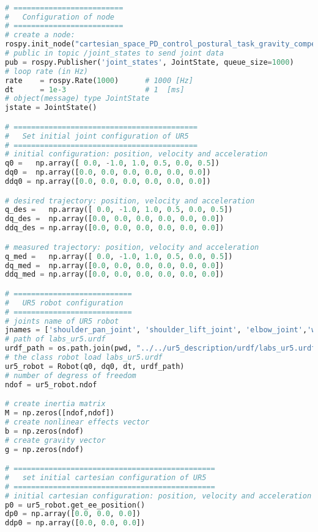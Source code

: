 \begin{lstlisting}[language=Python,caption=Move the ur5 robot end-effector using PD control method with gravity compensation and null space projection to follows the Cartesian step reference trajectory of activity \ref{subsec:generate_step_reference}., label={lst:cartesian_PD_control_g_postural_task}]

# =========================
#   Configuration of node
# =========================
# create a node: 
rospy.init_node("cartesian_space_PD_control_postural_task_gravity_compensation")
# public in topic /joint_states	to send joint data	
pub = rospy.Publisher('joint_states', JointState, queue_size=1000)
# loop rate (in Hz)
rate 	= rospy.Rate(1000)		# 1000 [Hz]
dt 		= 1e-3					# 1  [ms]
# object(message) type JointState
jstate = JointState()

# ==========================================
#   Set initial joint configuration of UR5
# ==========================================
# initial configuration: position, velocity and acceleration 
q0 =   np.array([ 0.0, -1.0, 1.0, 0.5, 0.0, 0.5])
dq0 =  np.array([0.0, 0.0, 0.0, 0.0, 0.0, 0.0]) 
ddq0 = np.array([0.0, 0.0, 0.0, 0.0, 0.0, 0.0]) 

# desired trajectory: position, velocity and acceleration
q_des =   np.array([ 0.0, -1.0, 1.0, 0.5, 0.0, 0.5])
dq_des =  np.array([0.0, 0.0, 0.0, 0.0, 0.0, 0.0]) 
ddq_des = np.array([0.0, 0.0, 0.0, 0.0, 0.0, 0.0]) 

# measured trajectory: position, velocity and acceleration
q_med =   np.array([ 0.0, -1.0, 1.0, 0.5, 0.0, 0.5])
dq_med =  np.array([0.0, 0.0, 0.0, 0.0, 0.0, 0.0]) 
ddq_med = np.array([0.0, 0.0, 0.0, 0.0, 0.0, 0.0]) 

# ===========================
#   UR5 robot configuration
# ===========================
# joints name of UR5 robot
jnames = ['shoulder_pan_joint', 'shoulder_lift_joint', 'elbow_joint','wrist_1_joint', 'wrist_2_joint', 'wrist_3_joint']
# path of labs_ur5.urdf
urdf_path = os.path.join(pwd, "../../ur5_description/urdf/labs_ur5.urdf")
# the class robot load labs_ur5.urdf
ur5_robot = Robot(q0, dq0, dt, urdf_path)
# number of degress of freedom
ndof = ur5_robot.ndof

# create inertia matrix 
M = np.zeros([ndof,ndof])
# create nonlinear effects vector
b = np.zeros(ndof)
# create gravity vector
g = np.zeros(ndof)

# ==============================================
#   set initial cartesian configuration of UR5
# ==============================================
# initial cartesian configuration: position, velocity and acceleration
p0 = ur5_robot.get_ee_position()
dp0 = np.array([0.0, 0.0, 0.0])
ddp0 = np.array([0.0, 0.0, 0.0])


\end{lstlisting}
